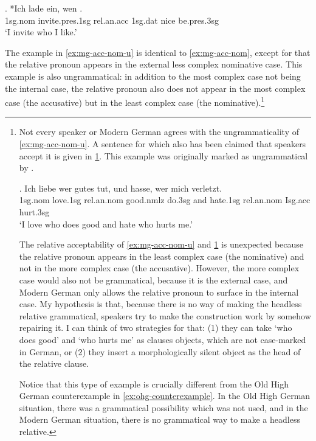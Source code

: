 \exg. *Ich {lade ein}, wen   .\\
1\ac{sg}.\ac{nom} invite.\ac{pres}.1\ac{sg}\scsub{[acc]} \ac{rel}.\ac{an}.\ac{acc} 1\ac{sg}.\ac{dat} nice be.\ac{pres}.3\ac{sg}\scsub{[nom]}\\
`I invite who I like.' \label{ex:mg-acc-nom}

The example in \ref{ex:mg-acc-nom-u} is identical to \ref{ex:mg-acc-nom}, except for that the relative pronoun appears in the external less complex nominative case. This example is also ungrammatical: in addition to the most complex case not being the internal case, the relative pronoun also does not appear in the most complex case (the accusative) but in the least complex case (the nominative).\footnote{
Not every speaker or Modern German agrees with the ungrammaticality of \ref{ex:mg-acc-nom-u}. A sentence for which also has been claimed that speakers accept it is given in \ref{ex:mg-liebe-hasse}. This example was originally marked as ungrammatical by .

\exg. Ich liebe wer gutes tut, und hasse, wer mich verletzt.\\
1\ac{sg}.\ac{nom} love.1\ac{sg}\scsub{[acc]} \ac{rel}.\ac{an}.\ac{nom} good.\ac{nmlz} do.3\ac{sg}\scsub{[nom]}
and hate.1\ac{sg}\scsub{[acc]} \ac{rel}.\ac{an}.\ac{nom} I\ac{sg}.\ac{acc} hurt.3\ac{sg}\scsub{[nom]}\\
`I love who does good and hate who hurts me.' \label{ex:mg-liebe-hasse}

The relative acceptability of \ref{ex:mg-acc-nom-u} and \ref{ex:mg-liebe-hasse} is unexpected because the relative pronoun appears in the least complex case (the nominative) and not in the more complex case (the accusative). However, the more complex case would also not be grammatical, because it is the external case, and Modern German only allows the relative pronoun to surface in the internal case. My hypothesis is that, because there is no way of making the headless relative grammatical, speakers try to make the construction work by somehow repairing it. I can think of two strategies for that: (1) they can take  `who does good' and  `who hurts me' as clauses objects, which are not case-marked in German, or (2) they insert a morphologically silent object as the head of the relative clause.

Notice that this type of example is crucially different from the Old High German counterexample in \ref{ex:ohg-counterexample}. In the Old High German situation, there was a grammatical possibility which was not used, and in the Modern German situation, there is no grammatical way to make a headless relative.
}

